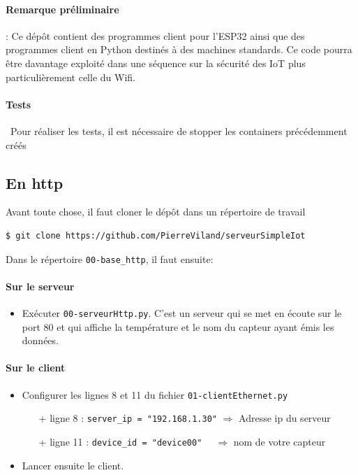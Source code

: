 \documentclass[french, 12pt]{article}%
\newcommand{\itemE}{\item[$\bullet$]}
\begin{document}
\paragraph{Remarque préliminaire} : Ce dépôt contient des programmes client pour l’ESP32 ainsi que des programmes client en Python destinés à des machines standards. Ce code pourra être davantage exploité dans une séquence sur la sécurité des IoT plus particulièrement celle du Wifi.  

\paragraph{Tests} \ 
Pour réaliser les tests, il est nécessaire de stopper les containers précédemment créés


\subsection{En http}

Avant toute chose, il faut cloner le dépôt dans un répertoire de travail 
\begin{lstlisting}[style=commande]
$ git clone https://github.com/PierreViland/serveurSimpleIot
\end{lstlisting}


Dans le répertoire \verb?00-base_http?, il faut ensuite: 

\paragraph{Sur le serveur} 
\begin{itemize}
\itemE  Exécuter \verb?00-serveurHttp.py?. C'est un serveur qui se met en écoute sur le port 80 et qui affiche la température et le nom du capteur ayant émis les données.
\end{itemize}


\paragraph{Sur le client} 

\begin{itemize}
\itemE Configurer les lignes 8 et 11 du fichier \verb?01-clientEthernet.py?
	\begin{itemize}
	\item[+] ligne 8 : \verb?server_ip = "192.168.1.30"? $\Rightarrow$ Adresse ip du serveur
	\item[+] ligne 11 : \verb?device_id = "device00"  ? $\Rightarrow$ nom de votre capteur
	\end{itemize}
\itemE Lancer ensuite le client.
\end{itemize}
\end{document}
